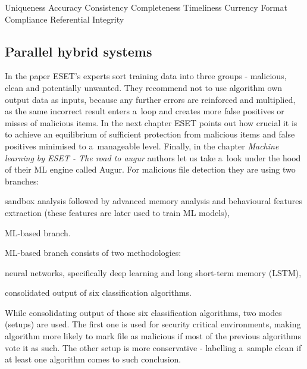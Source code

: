 Uniqueness
Accuracy
Consistency
Completeness
Timeliness
Currency
Format Compliance
Referential Integrity



\subsection{Parallel hybrid systems}\label{subsec:parallel-hybrid-systems}

In the paper  ESET's experts sort training data into three groups - malicious, clean and potentially unwanted.
They recommend not to use algorithm own output data as inputs, because any further errors are reinforced and multiplied, as the same incorrect result enters a~loop and creates more false positives or misses of malicious items.
In the next chapter ESET points out how crucial it is to achieve an equilibrium of sufficient protection from malicious items and false positives minimised to a~manageable level.
Finally, in the chapter \textit{Machine learning by ESET - The road to augur} authors let us take a~look under the hood of their ML engine called Augur.
For malicious file detection they are using two branches:
\begin{enumerate*}[label=(\roman*)]
    \item sandbox analysis followed by advanced memory analysis and behavioural features extraction (these features are later used to train ML models),
    \item ML-based branch.
\end{enumerate*}
ML-based branch consists of two methodologies:
\begin{enumerate*}[label=(\roman*)]
    \item neural networks, specifically deep learning and long short-term memory (LSTM),

    \item consolidated output of six classification algorithms.
\end{enumerate*}
While consolidating output of those six classification algorithms, two modes (setups) are used.
The first one is used for security critical environments, making algorithm more likely to mark file as malicious if most of the previous algorithms vote it as such.
The other setup is more conservative - labelling a~sample clean if at least one algorithm comes to such conclusion.

